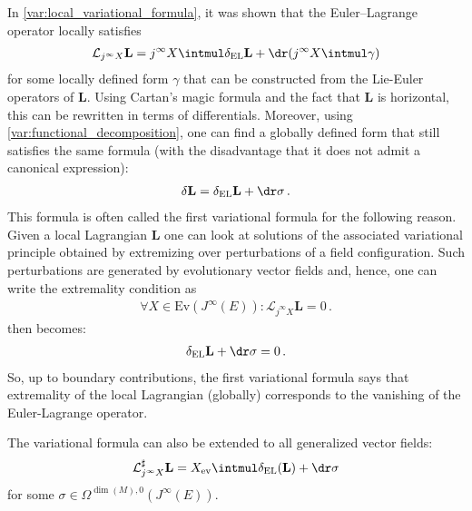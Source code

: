     \begin{property}
        In \cref{var:local_variational_formula}, it was shown that the Euler--Lagrange operator locally satisfies
        \begin{gather}
            \mathcal{L}_{j^\infty X}\mathbf{L} = j^\infty X\intmul\delta_{\text{EL}}\mathbf{L} + \dr(j^\infty X\intmul\gamma)
        \end{gather}
        for some locally defined form $\gamma$ that can be constructed from the Lie-Euler operators of $\mathbf{L}$. Using Cartan's magic formula and the fact that $\mathbf{L}$ is horizontal, this can be rewritten in terms of differentials. Moreover, using \cref{var:functional_decomposition}, one can find a globally defined form that still satisfies the same formula (with the disadvantage that it does not admit a canonical expression):
        \begin{gather}
            \label{var:first_variational_formula}
            \delta\mathbf{L} = \delta_{\text{EL}}\mathbf{L} + \dr\sigma\,.
        \end{gather}
        This formula is often called the first variational formula for the following reason. Given a local Lagrangian $\mathbf{L}$ one can look at solutions of the associated variational principle obtained by extremizing over perturbations of a field configuration. Such perturbations are generated by evolutionary vector fields and, hence, one can write the extremality condition as
        \begin{gather}
            \forall X\in\mathrm{Ev}(J^\infty(E)):\mathcal{L}_{j^\infty X}\mathbf{L} = 0\,.
        \end{gather}
         then becomes:
        \begin{gather}
            \delta_\mathrm{EL}\mathbf{L} + \dr\sigma = 0\,.
        \end{gather}
        So, up to boundary contributions, the first variational formula says that extremality of the local Lagrangian (globally) corresponds to the vanishing of the Euler-Lagrange operator.
    \end{property}
    \begin{result}\label{var:general_variational_formula}
        The variational formula can also be extended to all generalized vector fields:
        \begin{gather}
            \mathcal{L}^\sharp_{j^\infty X}\mathbf{L} = X_{\text{ev}}\intmul\delta_{\text{EL}}(\mathbf{L}) + \dr\sigma
        \end{gather}
        for some $\sigma\in\Omega^{\dim(M),0}(J^\infty(E))$.
    \end{result}

